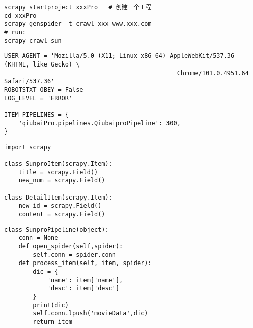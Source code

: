 \documentclass[a4paper,11pt]{ctexart}    %
\begin{document}
\begin{tcolorbox}[
         colback=red!5!white,
         colframe=teal,
         title=\textbf{bash}
    ]
\begin{verbatim}
scrapy startproject xxxPro   # 创建一个工程
cd xxxPro
scrapy genspider -t crawl xxx www.xxx.com
# run:
scrapy crawl sun
\end{verbatim}
\end{tcolorbox}

\begin{tcolorbox}[
         colback=red!5!white,
         colframe=teal,
         title=\textbf{settings.py}
    ]
\begin{verbatim}
USER_AGENT = 'Mozilla/5.0 (X11; Linux x86_64) AppleWebKit/537.36 (KHTML, like Gecko) \
                                                Chrome/101.0.4951.64 Safari/537.36'
ROBOTSTXT_OBEY = False
LOG_LEVEL = 'ERROR'

ITEM_PIPELINES = {
    'qiubaiPro.pipelines.QiubaiproPipeline': 300,
}
\end{verbatim}
\end{tcolorbox}

\begin{tcolorbox}[
         colback=red!5!white,
         colframe=teal,
         title=\textbf{items.py}
    ]
\begin{verbatim}
import scrapy

class SunproItem(scrapy.Item):
    title = scrapy.Field()
    new_num = scrapy.Field()

class DetailItem(scrapy.Item):
    new_id = scrapy.Field()
    content = scrapy.Field()
\end{verbatim}
\end{tcolorbox}

\begin{tcolorbox}[
         colback=red!5!white,
         colframe=teal,
         title=\textbf{pipelines.py}
    ]
\begin{verbatim}
class SunproPipeline(object):
    conn = None
    def open_spider(self,spider):
        self.conn = spider.conn
    def process_item(self, item, spider):
        dic = {
            'name': item['name'],
            'desc': item['desc']
        }
        print(dic)
        self.conn.lpush('movieData',dic)
        return item
\end{verbatim}
\end{tcolorbox}
\end{document}
